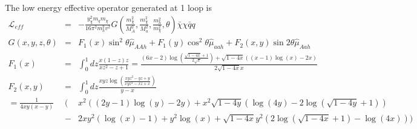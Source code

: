 The low energy effective operator generated at 1 loop is%
\begin{eqnarray}
\mathcal{L}_{eff} &=& - \frac{y_\chi^2 m_q m_\chi}{16\pi^2 m_h^2 v^2}     G\left(\frac{m_\chi^2}{M_{A}^2},\frac{m_\chi^2}{M_{a}^2},\frac{m_h^2}{m_\chi^2},\theta\right) \bar{\chi}\chi\bar{q}q\label{eq:loopps}\\
G\left(x,y,z,\theta\right) &=& F_1(x)\sin^2\theta\hat{\mu}_{AAh}+F_1(y)\cos^2\theta\hat{\mu}_{aah}+F_2(x,y)\sin2\theta\hat{\mu}_{Aah}\label{eq:f2}\\
F_1(x) &=& \int_0^1 dz \frac{x (1-z) z}{x z^2-z+1} = \frac{(6 x-2) \log \left(\frac{\sqrt{1-4 x}+1}{2 \sqrt{x}}\right)+\sqrt{1-4 x} ((x-1) \log (x)-2 x)}{2 \sqrt{1-4 x} x}\label{eq:f1}\\
F_2\left(x,y\right) &=& \int_0^1 dz \frac{x y z \log \left(\frac{x y z^2-y z+y}{x y z^2-x z+x}\right)}{y-x} \nonumber\\
= \frac{1}{4xy(x-y)} &\bigg(&x^2 ((2 y-1) \log (y)-2 y)+x^2 \sqrt{1-4 y} \left(\log (4 y)-2 \log \left(\sqrt{1-4 y}+1\right)\right) \\
&-&2 x y^2 (\log (x)-1)+y^2 \log (x)+\sqrt{1-4 x} y^2\left(2 \log \left(\sqrt{1-4 x}+1\right)-\log (4 x)\right) \bigg)
\end{eqnarray}

